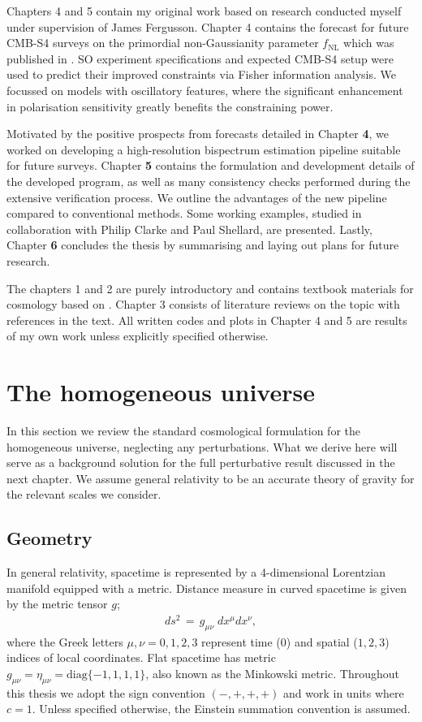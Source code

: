 Chapters 4 and 5 contain my original work based on research conducted myself under supervision of James Fergusson. Chapter 4 contains the forecast for future CMB-S4 surveys on the primordial non-Gaussianity parameter $f_\text{NL}$ which was published in \cite{Sohn2019}. SO experiment specifications and expected CMB-S4 setup were used to predict their improved constraints via Fisher information analysis. We focussed on models with oscillatory features, where the significant enhancement in polarisation sensitivity greatly benefits the constraining power.

Motivated by the positive prospects from forecasts detailed in Chapter \textbf{4}, we worked on developing a high-resolution bispectrum estimation pipeline suitable for future surveys. Chapter \textbf{5} contains the formulation and development details of the developed program, as well as many consistency checks performed during the extensive verification process. We outline the advantages of the new pipeline compared to conventional methods. Some working examples, studied in collaboration with Philip Clarke and Paul Shellard, are presented. Lastly, Chapter \textbf{6} concludes the thesis by summarising and laying out plans for future research.

The chapters 1 and 2 are purely introductory and contains textbook materials for cosmology based on \cite{Dodelson2003textbook,Fergusson2020cosmology,Challinor2009lecture,Baumann2018primordialNotes,Lim2012advancedCosmo}. Chapter 3 consists of literature reviews on the topic with references in the text. All written codes and plots in Chapter 4 and 5 are results of my own work unless explicitly specified otherwise.


\section{The homogeneous universe}

In this section we review the standard cosmological formulation for the homogeneous universe, neglecting any perturbations. What we derive here will serve as a background solution for the full perturbative result discussed in the next chapter. We assume general relativity to be an accurate theory of gravity for the relevant scales we consider.

\subsection{Geometry}

In general relativity, spacetime is represented by a 4-dimensional Lorentzian manifold equipped with a metric. Distance measure in curved spacetime is given by the metric tensor $g$;
\begin{align}
	ds^2 \,=\, g_{\mu \nu} \; dx^\mu dx^\nu	,
\end{align}
where the Greek letters $\mu, \nu = 0,1,2,3$ represent time ($0$) and spatial ($1,2,3$) indices of local coordinates. Flat spacetime has metric $g_{\mu\nu} = \eta_{\mu\nu} = \text{diag}\{-1, 1, 1, 1\}$, also known as the Minkowski metric. Throughout this thesis we adopt the sign convention $(-, +, +, +)$ and work in units where $c=1$. Unless specified otherwise, the Einstein summation convention is assumed. 

